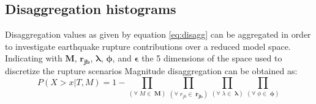 \subsection{Disaggregation histograms}
Disaggregation values as given by equation \ref{eq:disagg} can be aggregated in order to investigate earthquake rupture
contributions over a reduced model space. Indicating with $\bm{M}$, $\bm{r_{jb}}$, $\bm{\lambda}$, $\bm{\phi}$, and $\bm{\epsilon}$
the 5 dimensions of the space used to discretize the rupture scenarios
Magnitude disaggregation can be obtained as:
\begin{equation}
P(X > x | T, M) = 1 - \prod_{(\forall\;M\in\;\bm{M})}\prod_{(\forall\;r_{jb}\in\;\bm{r_{jb}})}\prod_{(\forall\;\lambda\in\;\bm{\lambda})}\prod_{(\forall\;\phi\in\;\bm{\phi})}
\end{equation}


%
%
%

